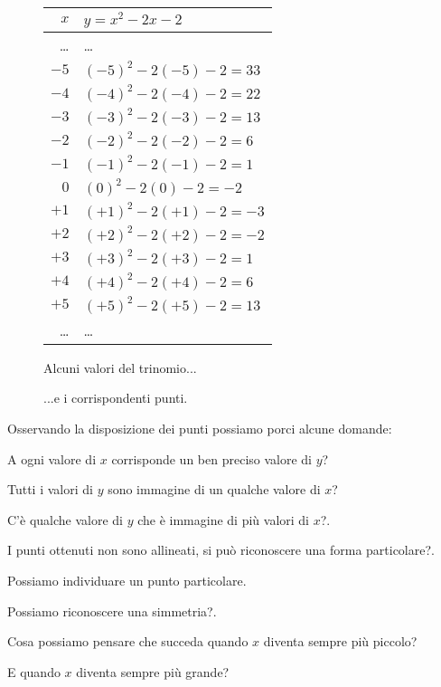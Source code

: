 \begin{figure}[h]
 \centering
 \begin{minipage}[]{.48\textwidth}
  \begin{center}
   \begin{tabular}{r|l}
    $x$   & $y=x^2-2x-2$ \\
    \hline
    \dots & \dots \\
    $-5$ & $(-5)^2 -2(-5) -2 = 33$ \\
    $-4$ & $(-4)^2 -2(-4) -2 = 22$ \\
    $-3$ & $(-3)^2 -2(-3) -2 = 13$ \\
    $-2$ & $(-2)^2 -2(-2) -2 = 6$ \\
    $-1$ & $(-1)^2 -2(-1) -2 = 1$ \\
     $0$ & $(0)^2 -2(0) -2 = -2$ \\
    $+1$ & $(+1)^2 -2(+1) -2 = -3$ \\
    $+2$ & $(+2)^2 -2(+2) -2 = -2$ \\
    $+3$ & $(+3)^2 -2(+3) -2 = 1$ \\
    $+4$ & $(+4)^2 -2(+4) -2 = 6$ \\
    $+5$ & $(+5)^2 -2(+5) -2 = 13$ \\
    \dots & \dots \\
   \end{tabular}
  \caption{Alcuni valori del trinomio...} \label{tab:trinomio0}
  \end{center}
 \end{minipage}
\begin{minipage}[]{.48\textwidth}
\begin{center}
\begin{inaccessibleblock}
  \puntia
  \caption{...e i corrispondenti punti.} \label{fig:trinomio0}
\end{inaccessibleblock}
\end{center}
\end{minipage}
\end{figure}

Osservando la disposizione dei punti possiamo porci alcune domande:
\begin{enumerate*}
 \item A ogni valore di $x$ corrisponde un ben preciso valore di $y$?
 \item Tutti i valori di $y$ sono immagine di un qualche valore di $x$?
 \item C'è qualche valore di $y$ che è immagine di più valori di $x$?.
 \item I punti ottenuti non sono allineati, si può riconoscere una forma 
  particolare?.
 \item Possiamo individuare un punto particolare.
 \item Possiamo riconoscere una simmetria?.
 \item Cosa possiamo pensare che succeda quando $x$ diventa sempre più piccolo?
 \item E quando $x$ diventa sempre più grande?
\end{enumerate*}

